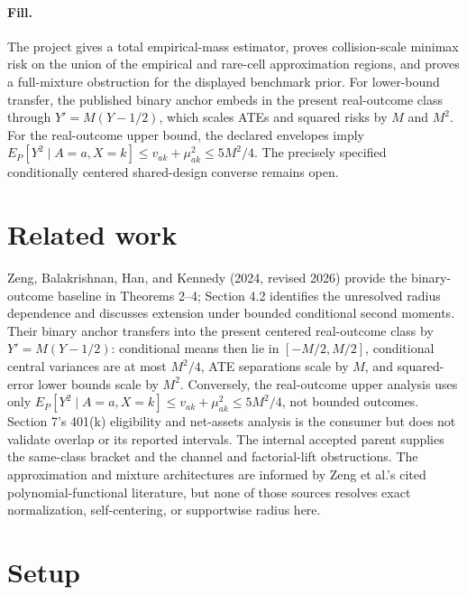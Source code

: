 \documentclass{article}
\begin{document}
\paragraph{Fill.} The project gives a total empirical-mass estimator, proves collision-scale minimax risk on the union of the empirical and rare-cell approximation regions, and proves a full-mixture obstruction for the displayed benchmark prior.  For lower-bound transfer, the published binary anchor embeds in the present real-outcome class through \(Y'=M(Y-1/2)\), which scales ATEs and squared risks by \(M\) and \(M^2\).  For the real-outcome upper bound, the declared envelopes imply \(E_P[Y^2\mid A=a,X=k]\le v_{ak}+\mu_{ak}^2\le5M^2/4\).  The precisely specified conditionally centered shared-design converse remains open.

\section{Related work}

Zeng, Balakrishnan, Han, and Kennedy (2024, revised 2026) provide the binary-outcome baseline in Theorems 2--4; Section 4.2 identifies the unresolved radius dependence and discusses extension under bounded conditional second moments.  Their binary anchor transfers into the present centered real-outcome class by \(Y'=M(Y-1/2)\): conditional means then lie in \([-M/2,M/2]\), conditional central variances are at most \(M^2/4\), ATE separations scale by \(M\), and squared-error lower bounds scale by \(M^2\).  Conversely, the real-outcome upper analysis uses only \(E_P[Y^2\mid A=a,X=k]\le v_{ak}+\mu_{ak}^2\le5M^2/4\), not bounded outcomes.  Section 7's 401(k) eligibility and net-assets analysis is the consumer but does not validate overlap or its reported intervals.  The internal accepted parent supplies the same-class bracket and the channel and factorial-lift obstructions.  The approximation and mixture architectures are informed by Zeng et al.'s cited polynomial-functional literature, but none of those sources resolves exact normalization, self-centering, or supportwise radius here.

\section{Setup}
\end{document}
